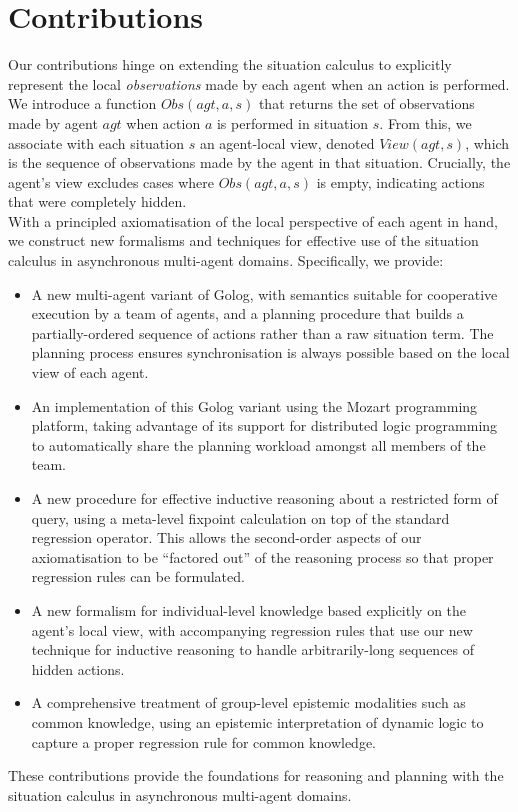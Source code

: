 \section{Contributions}

Our contributions hinge on extending the situation calculus to explicitly
represent the local \emph{observations} made by each agent when an
action is performed. We introduce a function $Obs(agt,a,s)$ that
returns the set of observations made by agent $agt$ when action $a$
is performed in situation $s$. From this, we associate with each
situation $s$ an agent-local view, denoted $View(agt,s)$, which
is the sequence of observations made by the agent in that situation.
Crucially, the agent's view excludes cases where $Obs(agt,a,s)$ is
empty, indicating actions that were completely hidden.\\


With a principled axiomatisation of the local perspective of each
agent in hand, we construct new formalisms and techniques for effective
use of the situation calculus in asynchronous multi-agent domains.
Specifically, we provide:

\begin{itemize}
\item A new multi-agent variant of Golog, with semantics suitable for cooperative
execution by a team of agents, and a planning procedure that builds
a partially-ordered sequence of actions rather than a raw situation
term. The planning process ensures synchronisation is always possible
based on the local view of each agent. 
\item An implementation of this Golog variant using the Mozart programming
platform, taking advantage of its support for distributed logic programming
to automatically share the planning workload amongst all members of
the team. 
\item A new procedure for effective inductive reasoning about a restricted
form of query, using a meta-level fixpoint calculation on top of the
standard regression operator. This allows the second-order aspects
of our axiomatisation to be {}``factored out'' of the reasoning
process so that proper regression rules can be formulated. 
\item A new formalism for individual-level knowledge based explicitly on
the agent's local view, with accompanying regression rules that use
our new technique for inductive reasoning to handle arbitrarily-long
sequences of hidden actions. 
\item A comprehensive treatment of group-level epistemic modalities such
as common knowledge, using an epistemic interpretation of dynamic
logic to capture a proper regression rule for common knowledge. 
\end{itemize}
These contributions provide the foundations for reasoning and planning
with the situation calculus in asynchronous multi-agent domains.\\


